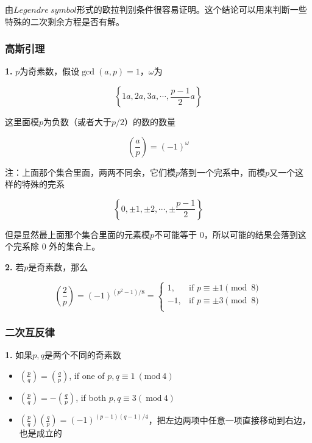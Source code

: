 \documentclass{article}
\begin{document}
由$Legendre\ symbol$形式的欧拉判别条件很容易证明。这个结论可以用来判断一些特殊的二次剩余方程是否有解。


\subsubsection{高斯引理}

\textbf{1.} $p$为奇素数，假设$\gcd(a,p)=1$，$\omega$为

\begin{equation}
    \left\{1a,2a,3a,\cdots,\frac{p-1}{2}a\right\}
    \nonumber
\end{equation}

这里面模$p$为负数（或者大于$p/2$）的数的数量

\begin{equation}
    \left(\frac{a}{p}\right)=(-1)^{\omega}
\end{equation}

注：上面那个集合里面，两两不同余，它们模$p$落到一个完系中，而模$p$又一个这样的特殊的完系

\begin{equation}
    \left\{0, \pm 1, \pm 2,\cdots,\pm \frac{p-1}{2}\right\}
    \nonumber
\end{equation}

但是显然最上面那个集合里面的元素模$p$不可能等于 0，所以可能的结果会落到这个完系除 0 外的集合上。


\textbf{2.} 若$p$是奇素数，那么

\begin{equation}
    \left(\frac{2}{p}\right)=\left(-1\right)^{(p^2-1)/8}=
    \begin{cases}
        1, &\text{if }p\equiv \pm 1\pmod{8}\\
        -1,&\text{if }p\equiv \pm 3\pmod{8}\\
    \end{cases}
    \nonumber
\end{equation}

\subsubsection{二次互反律}

\textbf{1.} 如果$p,q$是两个不同的奇素数 

\begin{itemize}
    \item $\displaystyle \left(\frac{p}{q}\right)=\left(\frac{q}{p}\right)$, if one of $p,q\equiv 1~(\mathrm{mod}~4)$
    \item $\displaystyle \left(\frac{p}{q}\right)=-\left(\frac{q}{p}\right)$, if both $p,q\equiv 3(~\mathrm{mod}~4)$
    \item $\displaystyle \left(\frac{p}{q}\right)\left(\frac{q}{p}\right)=(-1)^{(p-1)(q-1)/4}$，把左边两项中任意一项直接移动到右边，也是成立的
\end{itemize}
\end{document}
